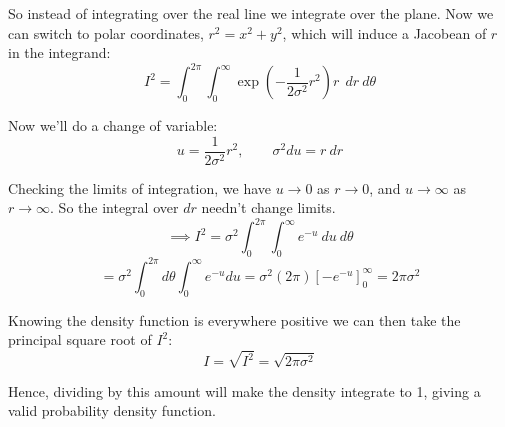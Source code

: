 \documentclass[../main.tex]{subfiles}
\begin{document}
\begin{enumerate}
So instead of integrating over the real line we integrate over the plane. Now we can switch to polar coordinates, $r^2 = x^2 + y^2$, which will induce a Jacobean of $r$ in the integrand:
$$I^2 = \int_{0}^{2\pi}\int_0^\infty \exp\left(-\frac{1}{2\sigma^2}r^2\right) r \ \ dr \ d\theta$$

Now we'll do a change of variable:
$$u = \frac{1}{2\sigma^2}r^2, \qquad \sigma^2 du = r \ dr$$

Checking the limits of integration, we have $u \rightarrow 0$ as $r \rightarrow 0 $, and $u \rightarrow \infty$ as $r \rightarrow \infty$. So the integral over $dr$ needn't change limits.
$$\implies I^2 = \sigma^2 \int_0^{2\pi}\int_0^\infty e^{-u} \ du \ d\theta$$
$$= \sigma^2 \int_0^{2\pi}d\theta \int_0^\infty e^{-u} du = \sigma^2 (2\pi)\left[-e^{-u}\right]^\infty_0 = 2\pi \sigma^2$$

Knowing the density function is everywhere positive we can then take the principal square root of $I^2$:
$$I = \sqrt{I^2} = \sqrt{2\pi \sigma^2}$$

Hence, dividing by this amount will make the density integrate to 1, giving a valid probability density function.


\end{enumerate}
\end{document}
